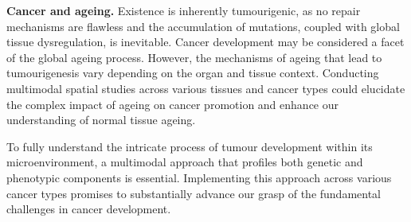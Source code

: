 \textbf{Cancer and ageing.} Existence is inherently tumourigenic, as no repair mechanisms are flawless and the accumulation of mutations, coupled with global tissue dysregulation, is inevitable. Cancer development may be considered a facet of the global ageing process. However, the mechanisms of ageing that lead to tumourigenesis vary depending on the organ and tissue context. Conducting multimodal spatial studies across various tissues and cancer types could elucidate the complex impact of ageing on cancer promotion and enhance our understanding of normal tissue ageing.

To fully understand the intricate process of tumour development within its microenvironment, a multimodal approach that profiles both genetic and phenotypic components is essential. Implementing this approach across various cancer types promises to substantially advance our grasp of the fundamental challenges in cancer development.